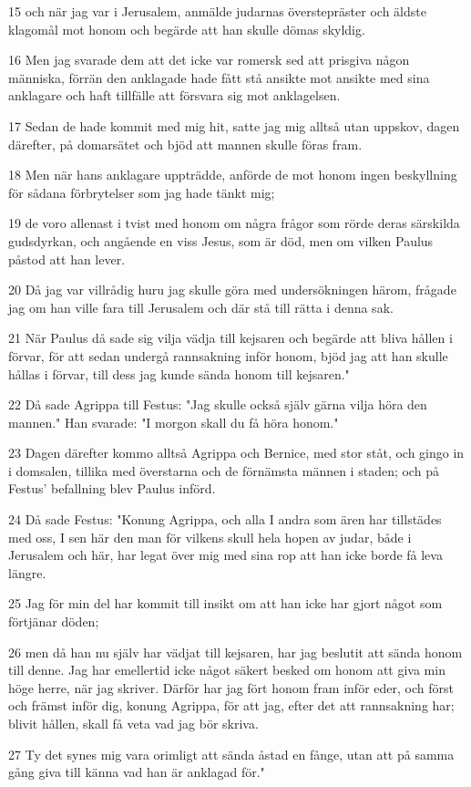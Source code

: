 \par 15 och när jag var i Jerusalem, anmälde judarnas överstepräster och äldste klagomål mot honom och begärde att han skulle dömas skyldig.
\par 16 Men jag svarade dem att det icke var romersk sed att prisgiva någon människa, förrän den anklagade hade fått stå ansikte mot ansikte med sina anklagare och haft tillfälle att försvara sig mot anklagelsen.
\par 17 Sedan de hade kommit med mig hit, satte jag mig alltså utan uppskov, dagen därefter, på domarsätet och bjöd att mannen skulle föras fram.
\par 18 Men när hans anklagare uppträdde, anförde de mot honom ingen beskyllning för sådana förbrytelser som jag hade tänkt mig;
\par 19 de voro allenast i tvist med honom om några frågor som rörde deras särskilda gudsdyrkan, och angående en viss Jesus, som är död, men om vilken Paulus påstod att han lever.
\par 20 Då jag var villrådig huru jag skulle göra med undersökningen härom, frågade jag om han ville fara till Jerusalem och där stå till rätta i denna sak.
\par 21 När Paulus då sade sig vilja vädja till kejsaren och begärde att bliva hållen i förvar, för att sedan undergå rannsakning inför honom, bjöd jag att han skulle hållas i förvar, till dess jag kunde sända honom till kejsaren."
\par 22 Då sade Agrippa till Festus: "Jag skulle också själv gärna vilja höra den mannen." Han svarade: "I morgon skall du få höra honom."
\par 23 Dagen därefter kommo alltså Agrippa och Bernice, med stor ståt, och gingo in i domsalen, tillika med överstarna och de förnämsta männen i staden; och på Festus' befallning blev Paulus införd.
\par 24 Då sade Festus: "Konung Agrippa, och alla I andra som ären har tillstädes med oss, I sen här den man för vilkens skull hela hopen av judar, både i Jerusalem och här, har legat över mig med sina rop att han icke borde få leva längre.
\par 25 Jag för min del har kommit till insikt om att han icke har gjort något som förtjänar döden;
\par 26 men då han nu själv har vädjat till kejsaren, har jag beslutit att sända honom till denne. Jag har emellertid icke något säkert besked om honom att giva min höge herre, när jag skriver. Därför har jag fört honom fram inför eder, och först och främst inför dig, konung Agrippa, för att jag, efter det att rannsakning har; blivit hållen, skall få veta vad jag bör skriva.
\par 27 Ty det synes mig vara orimligt att sända åstad en fånge, utan att på samma gång giva till känna vad han är anklagad för."

